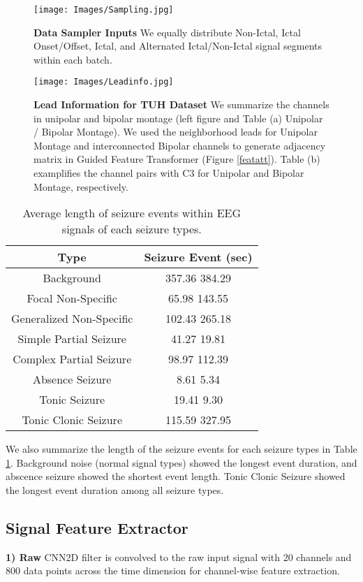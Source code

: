 \documentclass[pmlr,twocolumn,10pt]{jmlr}
\begin{document}
\begin{figure}[h!]
	\centering
	\texttt{[image: Images/Sampling.jpg]}
    \caption{\small \textbf{Data Sampler Inputs} We equally distribute Non-Ictal, Ictal Onset/Offset, Ictal, and Alternated Ictal/Non-Ictal signal segments within each batch.}
	\label{sampling}
\end{figure} 
\begin{figure*}[h!]
	\centering
	\texttt{[image: Images/Leadinfo.jpg]}
    \caption{\small \textbf{Lead Information for TUH Dataset} We summarize the channels in unipolar and bipolar montage (left figure and Table (a) Unipolar / Bipolar Montage). We used the neighborhood leads for Unipolar Montage and interconnected Bipolar channels to generate adjacency matrix in Guided Feature Transformer (Figure \ref{featatt}). Table (b) examplifies the channel pairs with C3 for Unipolar and Bipolar Montage, respectively.}
	\label{leadinfo}
\end{figure*} \begin{table}[h!]
    \footnotesize
	\centering
	\caption{Average length of seizure events within EEG signals of each seizure types.}
	\label{length}
	\begin{tabular}{c|c}
		\toprule
		Type & Seizure Event (sec) \\
		\midrule
		Background & 357.36  384.29\\
		Focal Non-Specific & 65.98  143.55\\
		Generalized Non-Specific & 102.43  265.18\\
		Simple Partial Seizure & 41.27  19.81\\
		Complex Partial Seizure & 98.97  112.39\\
		Absence Seizure & 8.61  5.34\\
		Tonic Seizure & 19.41  9.30\\
		Tonic Clonic Seizure & 115.59  327.95\\
		\bottomrule
	\end{tabular}
\end{table} We also summarize the length of the seizure events for each seizure types in Table \ref{length}. Background noise (normal signal types) showed the longest event duration, and abscence seizure showed the shortest event length. Tonic Clonic Seizure showed the longest event duration among all seizure types.

\subsection{Signal Feature Extractor}
\label{sec: featextractor}
\textbf{1) Raw}
 CNN2D filter is convolved to the raw input signal with 20 channels and 800 data points across the time dimension for channel-wise feature extraction.
\end{document}
